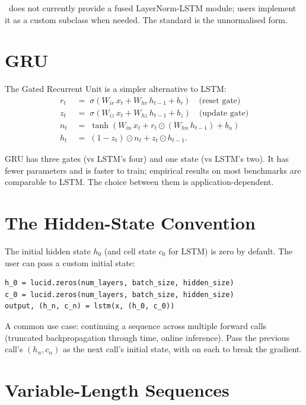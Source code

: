 \Lucid\ does not currently provide a fused LayerNorm-LSTM
module; users implement it as a custom 
subclass when needed. The standard  is the
unnormalised form.

\section{GRU}
\label{sec:rnn_family:gru}

The Gated Recurrent Unit is a simpler alternative to LSTM:
\begin{align*}
r_t &\;=\; \sigma(W_{ir}\, x_t + W_{hr}\, h_{t-1} + b_r)
   \quad\text{(reset gate)} \\
z_t &\;=\; \sigma(W_{iz}\, x_t + W_{hz}\, h_{t-1} + b_z)
   \quad\text{(update gate)} \\
n_t &\;=\; \tanh(W_{in}\, x_t + r_t \odot (W_{hn}\, h_{t-1}) + b_n) \\
h_t &\;=\; (1 - z_t) \odot n_t + z_t \odot h_{t-1}.
\end{align*}

GRU has three gates (vs LSTM's four) and one state (vs LSTM's
two). It has fewer parameters and is faster to train; empirical
results on most benchmarks are comparable to LSTM. The choice
between them is application-dependent.

\section{The Hidden-State Convention}
\label{sec:rnn_family:hidden_convention}

The initial hidden state $h_0$ (and cell state $c_0$ for LSTM) is
zero by default. The user can pass a custom initial state:

\begin{lstlisting}[style=lucid,language=LucidPython]
h_0 = lucid.zeros(num_layers, batch_size, hidden_size)
c_0 = lucid.zeros(num_layers, batch_size, hidden_size)
output, (h_n, c_n) = lstm(x, (h_0, c_0))
\end{lstlisting}

A common use case: continuing a sequence across multiple forward
calls (truncated backpropagation through time, online inference).
Pass the previous call's $(h_n, c_n)$ as the next call's initial
state, with  on each to break the gradient.

\section{Variable-Length Sequences}
\label{sec:rnn_family:variable_length}

